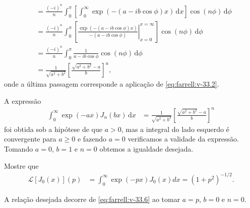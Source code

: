 \documentclass[a4paper,12pt, leqno, answers]{exam}
\begin{document}
\begin{questions}
\begin{solution}
\begin{align*}
            &= \frac{(-i)^n}{n} \int_0^\pi \left[ \int_0^\infty \exp(-(a - i b \cos \phi)x) \,\mathrm{d}x \right] \cos(n \phi) \,\mathrm{d}\phi \\
            &= \frac{(-i)^n}{n} \int_0^\pi \left[ \left. \frac{\exp(-(a - ib \cos\phi)x)}{-(a - i b \cos\phi)} \right|_{x = 0}^{x = \infty} \right] \cos(n \phi) \,\mathrm{d}\phi \\
            &= \frac{(-i)^n}{n} \int_0^\pi \frac{1}{a - i b \cos\phi} \cos(n \phi) \,\mathrm{d}\phi \\
            &= \frac{1}{\sqrt{a^2 + b^2}} \left[ \frac{\sqrt{a^2 + b^2} - a}{b} \right]^n,
        \end{align*}
        onde a \'{u}ltima passagem corresponde a aplica\c{c}\~{a}o de \eqref{eq:farrell:v-33.2}.

        A express\~{a}o
        \begin{align}
            \int_0^\infty \exp(-ax) J_n(bx) \,\mathrm{d}x &= \frac{1}{\sqrt{a^2 + b^2}} \left[ \frac{\sqrt{a^2 + b^2} - a}{b} \right]^n \label{eq:farrell:v-33.6}
        \end{align}
        foi obtida sob a hip\'{o}tese de que $a > 0$, mas a integral do lado esquerdo \'{e} convergente para $a \geq 0$ e fazendo $a = 0$ verificamos a validade da express\~{a}o. Tomando $a = 0$, $b = 1$ e $n = 0$ obtemos a igualdade desejada.
    \end{solution}

    \question Mostre que
    \begin{align*}
        \mathcal{L}[J_0(x)](p) &= \int_0^\infty \exp(-px) J_0(x) dx = (1 + p^2)^{-1/2}.
    \end{align*}
    \begin{solution}
        A rela\c{c}\~{a}o desejada decorre de \eqref{eq:farrell:v-33.6} ao tomar $a = p$, $b = 0$ e $n = 0$.


\end{solution}
\end{questions}
\end{document}

